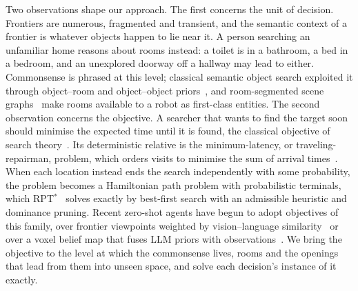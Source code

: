 \documentclass[10pt]{article}
\begin{document}
Two observations shape our approach. The first concerns the unit of decision. Frontiers are numerous, fragmented
and transient, and the semantic context of a frontier is whatever objects happen to lie near it. A person searching
an unfamiliar home reasons about rooms instead: a toilet is in a bathroom, a bed in a bedroom, and an unexplored
doorway off a hallway may lead to either. Commonsense is phrased at this level; classical semantic object search
exploited it through object--room and object--object priors~\citep{kollar2009utilizing,aydemir2013active}, and
room-segmented scene graphs~\citep{hughes2022hydra,werby2024hierarchical,honerkamp2024language} make rooms
available to a robot as first-class entities. The second observation concerns the objective. A searcher that wants
to find the target soon should minimise the expected time until it is found, the classical objective of search
theory~\citep{stone1975theory}. Its deterministic relative is the minimum-latency, or traveling-repairman, problem,
which orders visits to minimise the sum of arrival times~\citep{blum1994minimum}. When each location instead ends
the search independently with some probability, the problem becomes a Hamiltonian path problem with probabilistic
terminals, which RPT$^*$~\citep{lyu2026rpt} solves exactly by best-first search with an admissible heuristic and
dominance pruning. Recent zero-shot agents have begun to adopt objectives of this family, over frontier viewpoints
weighted by vision--language similarity~\citep{liu2026global} or over a voxel belief map that fuses LLM priors with
observations~\citep{zhou2025beliefmapnav}. We bring the objective to the level at which the commonsense lives,
rooms and the openings that lead from them into unseen space, and solve each decision's instance of it exactly.
\end{document}
